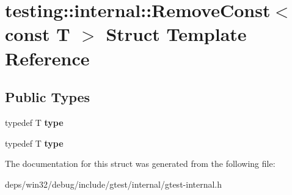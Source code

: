 \hypertarget{structtesting_1_1internal_1_1_remove_const_3_01const_01_t_01_4}{}\section{testing\+:\+:internal\+:\+:Remove\+Const$<$ const T $>$ Struct Template Reference}
\label{structtesting_1_1internal_1_1_remove_const_3_01const_01_t_01_4}
\subsection*{Public Types}
\begin{DoxyCompactItemize}
\item 
\hypertarget{structtesting_1_1internal_1_1_remove_const_3_01const_01_t_01_4_ac88c6824d228ab05091e5a4f1c1a95fc}{}typedef T {\bfseries type}\label{structtesting_1_1internal_1_1_remove_const_3_01const_01_t_01_4_ac88c6824d228ab05091e5a4f1c1a95fc}

\item 
\hypertarget{structtesting_1_1internal_1_1_remove_const_3_01const_01_t_01_4_ac88c6824d228ab05091e5a4f1c1a95fc}{}typedef T {\bfseries type}\label{structtesting_1_1internal_1_1_remove_const_3_01const_01_t_01_4_ac88c6824d228ab05091e5a4f1c1a95fc}

\end{DoxyCompactItemize}


The documentation for this struct was generated from the following file\+:\begin{DoxyCompactItemize}
\item 
deps/win32/debug/include/gtest/internal/gtest-\/internal.\+h\end{DoxyCompactItemize}
